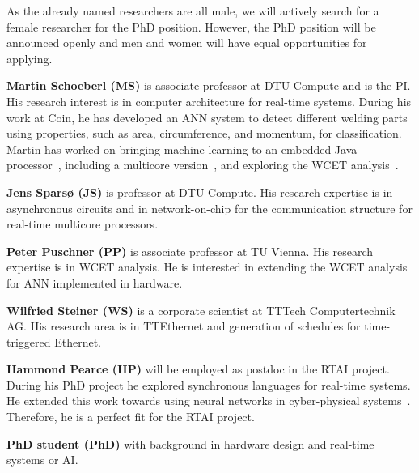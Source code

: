 \documentclass[fleqn,12pt]{article}
\begin{document}

As the already named researchers are all male, we will actively search
for a female researcher for the PhD position.
However, the PhD position will be announced openly and men and women
will have equal opportunities for applying.


  {\bf Martin Schoeberl (MS)} is associate professor at DTU Compute and is the PI.
   His research interest is in computer architecture for real-time systems. During his work at Coin,
   he has developed an ANN system to detect different welding parts using
   properties, such as area, circumference, and momentum, for classification.
   Martin has worked on bringing machine learning to an embedded Java processor~\cite{pedersen:2006-64}, including a multicore
   version~\cite{jop:cmpsvn}, and exploring the WCET analysis~\cite{jop:wcet:spe}.
   
    {\bf Jens Spars{\o} (JS)} is professor at DTU Compute. His research expertise is in asynchronous
    circuits and in network-on-chip for the communication structure for real-time multicore processors.
    
    {\bf Peter Puschner (PP)} is associate professor at TU Vienna. His research expertise is
    in WCET analysis. He is interested in extending the WCET analysis
    for ANN implemented in hardware.
    
    {\bf Wilfried Steiner (WS)} is a corporate scientist at TTTech Computertechnik AG.
    His research area is in TTEthernet and generation of schedules for time-triggered Ethernet.
    
    {\bf Hammond Pearce (HP)} will be employed as postdoc in the RTAI project. During his PhD
    project he explored synchronous languages for real-time systems. He extended
    this work towards using neural networks in cyber-physical systems~\cite{syncnn:roop:2018}.
    Therefore, he is a perfect fit for the RTAI project.
    
    {\bf PhD student (PhD)} with background in hardware design and real-time systems or AI.
    
%
\end{document}
